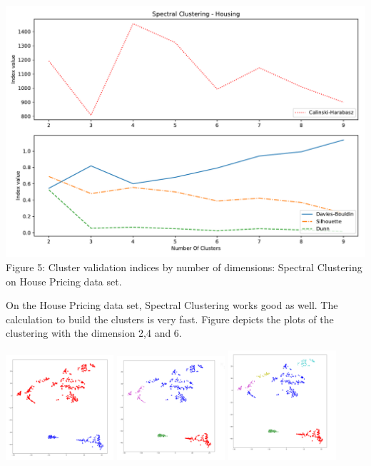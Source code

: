   \includegraphics[width=1\textwidth]{images/Spectral_Clustering_-_Housing.pdf} \newline
 Figure 5: Cluster validation indices by number of dimensions: Spectral Clustering on House Pricing data set.\newline
 
 On the House Pricing data set, Spectral Clustering works good as well. The calculation to build the clusters is very fast. Figure depicts the plots of the clustering with the dimension 2,4 and 6. \newline
 
\includegraphics[width=0.3\textwidth]{images/2.PNG} 
\includegraphics[width=0.3\textwidth]{images/4.PNG} 
\includegraphics[width=0.3\textwidth]{images/6.PNG} \newline
  
